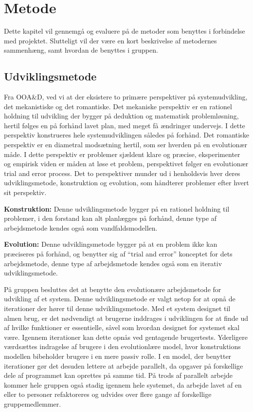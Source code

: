 \chapter{Metode}\label{chapter:Metode}

Dette kapitel vil gennemgå og evaluere på de metoder som benyttes i forbindelse med projektet.
Slutteligt vil der være en kort beskrivelse af metodernes sammenhæng, samt hvordan de benyttes i gruppen.

\section{Udviklingsmetode}\label{s:udviklingsmetode}
Fra OOA\&D, ved vi at der eksistere to primære perspektiver på systemudvikling, det mekanistiske og det romantiske.
Det mekaniske perspektiv er en rationel holdning til udvikling der bygger på deduktion og matematisk problemløsning, hertil følges en på forhånd lavet plan, med meget få ændringer undervejs.
I dette perspektiv konstrueres hele systemudviklingen således på forhånd.
Det romantiske perspektiv er en diametral modsætning hertil, som ser hverden på en evolutionær måde.
I dette perspektiv er problemer sjældent klare og præcise, eksperimenter og empirisk viden er måden at løse et problem, perspektivet følger en evolutionær trial and error process.
Det to perspektiver munder ud i henholdsvis hver deres udviklingsmetode, konstruktion og evolution, som håndterer problemer efter hvert sit perspektiv.\citep{OOA&D2001}

\textbf{Konstruktion:}
Denne udviklingsmetode bygger på en rationel holdning til problemer, i den forstand kan alt planlægges på forhånd, denne type af arbejdsmetode kendes også som vandfaldsmodellen.

\textbf{Evolution:}
Denne udviklingsmetode bygger på at en problem ikke kan præciseres på forhånd, og benytter sig af ``trial and error'' konceptet for dets arbejdsmetode, denne type af arbejdsmetode kendes også som en iterativ udviklingsmetode.

På gruppen besluttes det at benytte den evolutionære arbejdsmetode for udvikling af et system. 
Denne udviklingsmetode er valgt netop for at opnå de iterationer der hører til denne udviklingsmetode. 
Med et system designet til almen brug, er det nødvendigt at brugerne inddrages i udviklingen for at finde ud af hvilke funktioner er essentielle, såvel som hvordan designet for systemet skal være. 
Igennem iterationer kan dette opnås ved gentagende brugertests. 
Yderligere værdsættes indragelse af brugere i den evolutionlære model, hvor konstruktions modellen bibeholder brugere i en mere passiv rolle.
I en model, der benytter iterationer gør det desuden lettere at arbejde parallelt, da opgaver på forskellige dele af programmet kan oprettes på samme tid.
På trods af parallelt arbejde kommer hele gruppen også stadig igennem hele systemet, da arbejde lavet af en eller to personer refaktoreres og udvides over flere gange af forskellige gruppemedlemmer.

